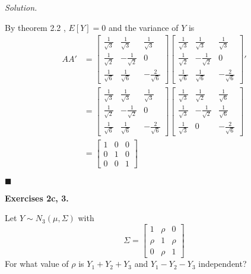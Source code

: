 \documentclass{article}
\begin{document}
\textit{Solution. }  

By theorem 2.2 , \(E[Y] = 0\) and the variance of \(Y\) is 
\begin{align*}
AA'&= \begin{bmatrix}
\frac1{\sqrt{3 }} & \frac1{\sqrt{ 3}}&\frac1{\sqrt{ 3} }\\
\frac1{\sqrt{ 2}}&-\frac1{\sqrt{ 2}} &0\\
\frac1{\sqrt{ 6} }& \frac1{\sqrt{ 6}}   &-\frac2{\sqrt{ 6} }
\end{bmatrix}\begin{bmatrix}
\frac1{\sqrt{3 }} & \frac1{\sqrt{ 3}}&\frac1{\sqrt{ 3} }\\
\frac1{\sqrt{ 2}}&-\frac1{\sqrt{ 2}} &0\\
\frac1{\sqrt{ 6} }& \frac1{\sqrt{ 6}}   &-\frac2{\sqrt{ 6} }
\end{bmatrix}'\\
&=\begin{bmatrix}
\frac1{\sqrt{3 }} & \frac1{\sqrt{ 3}}&\frac1{\sqrt{ 3} }\\
\frac1{\sqrt{ 2}}&-\frac1{\sqrt{ 2}} &0\\
\frac1{\sqrt{ 6} }& \frac1{\sqrt{ 6}}   &-\frac2{\sqrt{ 6} }
\end{bmatrix}\begin{bmatrix}
\frac1{\sqrt{3 }} &\frac1{\sqrt{ 2}}&\frac1{\sqrt{ 6} }\\
 \frac1{\sqrt{ 3}}&-\frac1{\sqrt{ 2}} & \frac1{\sqrt{ 6}}   \\
 \frac1{\sqrt{ 3} }& 0& -\frac2{\sqrt{ 6} }
\end{bmatrix}\\
&=  \begin{bmatrix}
1 & 0 &0 \\
0 & 1&0 \\ 
0 & 0 & 1 
\end{bmatrix}
\end{align*}

\begin{flushright}
\(\blacksquare\)
\end{flushright} 


\newpage
\textbf{Exercises 2c, 3.} 

Let \(Y \sim N_3(\mu,\Sigma) \) with 
\[
\Sigma = \begin{bmatrix}
1& \rho &0\\
\rho & 1 & \rho \\
0 & \rho & 1 
\end{bmatrix}
\]
For what value of \(\rho \) is \(Y_1 + Y_2 +Y_3\) and \(Y_1-Y_2-Y_3\) independent? 
\end{document}
